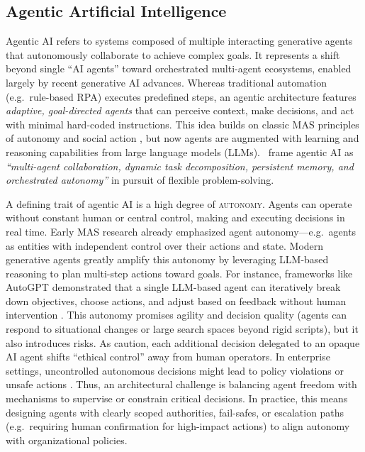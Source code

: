 \subsection{Agentic Artificial Intelligence}\label{subsec:agentic-ai} 
Agentic AI refers to systems composed of multiple interacting generative agents that autonomously collaborate to achieve complex goals. It represents a shift beyond single “AI agents” toward orchestrated multi-agent ecosystems, enabled largely by recent generative AI advances. Whereas traditional automation (e.g.~rule-based RPA) executes predefined steps, an agentic architecture features \emph{adaptive, goal-directed agents} that can perceive context, make decisions, and act with minimal hard-coded instructions. This idea builds on classic MAS principles of autonomy and social action \parencite{castelfranchiModelling1998,ferberMultiagent1999}, but now agents are augmented with learning and reasoning capabilities from large language models (LLMs).~\textcite{sapkotaAI2026} frame agentic AI as \textit{“multi-agent collaboration, dynamic task decomposition, persistent memory, and orchestrated autonomy”} in pursuit of flexible problem-solving.

A defining trait of agentic AI is a high degree of \textsc{autonomy}. Agents can operate without constant human or central control, making and executing decisions in real time. Early MAS research already emphasized agent autonomy---e.g.~agents as entities with independent control over their actions and state. Modern generative agents greatly amplify this autonomy by leveraging LLM-based reasoning to plan multi-step actions toward goals. For instance, frameworks like AutoGPT demonstrated that a single LLM-based agent can iteratively break down objectives, choose actions, and adjust based on feedback without human intervention \parencite{sapkotaAI2026}. This autonomy promises agility and decision quality (agents can respond to situational changes or large search spaces beyond rigid scripts), but it also introduces risks. As \textcite{russellResearch2015} caution, each additional decision delegated to an opaque AI agent shifts “ethical control” away from human operators. In enterprise settings, uncontrolled autonomous decisions might lead to policy violations or unsafe actions \parencite{gauravGovernance2025}. Thus, an architectural challenge is balancing agent freedom with mechanisms to supervise or constrain critical decisions. In practice, this means designing agents with clearly scoped authorities, fail-safes, or escalation paths (e.g.~requiring human confirmation for high-impact actions) to align autonomy with organizational policies.

